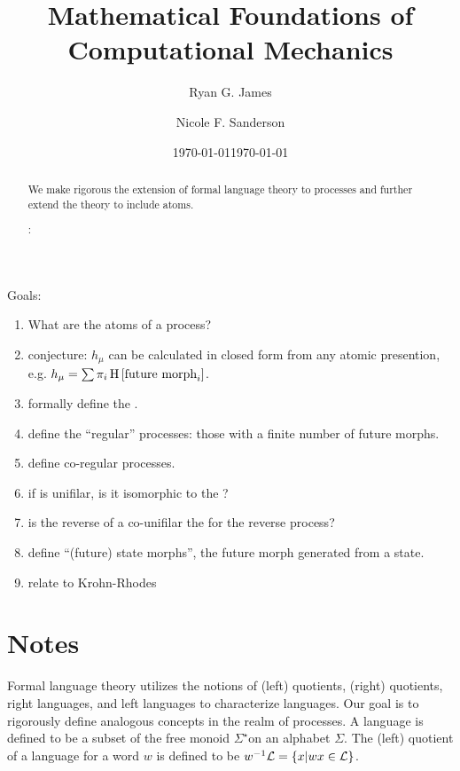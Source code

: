 \documentclass[prl,twocolumn,superscriptaddress,preprintnumbers,floatfix]{revtex4-1}
\begin{document}
\title{Mathematical Foundations of Computational Mechanics}

\author{Ryan G. James}

\author{Nicole F. Sanderson}

\date{\today}


\date{\today}

\begin{abstract}

We make rigorous the extension of formal language theory to processes and further extend the theory to include atoms. 

\vspace{0.1in}
:

\end{abstract}

\maketitle

Goals:
\begin{enumerate}
  \item What are the atoms of a process?
  \item conjecture: $h_\mu$ can be calculated in closed form from any atomic presention, e.g. $h_\mu = \sum \pi_i \operatorname{H}\left[\textrm{future morph}_i\right]$.
  \item formally define the \etomata.
  \item define the ``regular'' processes: those with a finite number of future morphs.
  \item define co-regular processes.
  \item if \etomata is unifilar, is it isomorphic to the \emachine?
  \item is the reverse of a co-unifilar \emachine the \emachine for the reverse process?
  \item define ``(future) state morphs'', the future morph generated from a state.
  \item relate to Krohn-Rhodes
\end{enumerate}

\section{Notes}
Formal language theory utilizes the notions of (left) quotients, (right) quotients, right languages, and left languages to characterize languages.  Our goal is to rigorously define analogous concepts in the realm of processes.  A language \Language is defined to be a subset of the free monoid $\Sigma^{\star}$on an alphabet $\Sigma$. The (left) quotient of a language \Language for a word $w$ is defined to be $w^{-1}\mathcal{L} = \{ x | wx \in \mathcal{L} \}$. 
\end{document}

